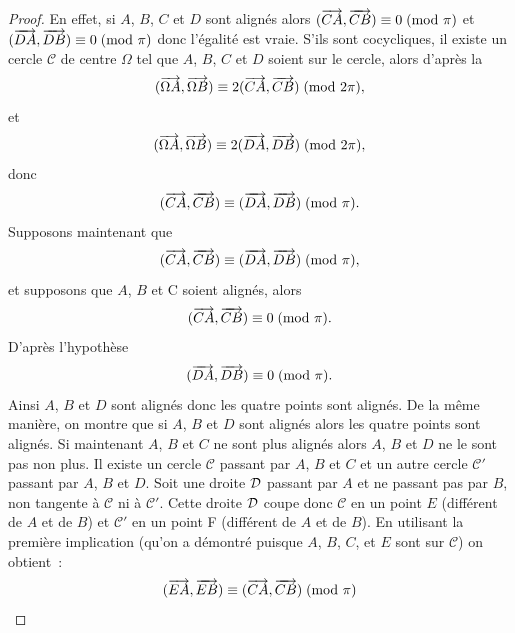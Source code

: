 \begin{proof}
  En effet, si \(A\), \(B\), \(C\) et \(D\) sont alignés alors
  \((\overrightarrow{CA},\overrightarrow{CB}) \equiv 0\!\pmod {\pi}\) et
  \((\overrightarrow{DA},\overrightarrow{DB}) \equiv 0\!\pmod {\pi}\) donc l'égalité est vraie. S'ils
  sont cocycliques, il existe un cercle \(\mathcal{C}\) de centre \(\Omega\)
  tel que \(A\), \(B\), \(C\) et \(D\) soient sur le cercle, alors d'après la
  \begin{equation}
    (\overrightarrow{\Omega A}, \overrightarrow{\Omega B}) \equiv 2(\overrightarrow{CA},\overrightarrow{CB})\!\pmod {2\pi},
  \end{equation}
  et \begin{equation}
    (\overrightarrow{\Omega A}, \overrightarrow{\Omega B}) \equiv 2(\overrightarrow{DA},\overrightarrow{DB})\!\pmod {2\pi},
  \end{equation}
  donc \begin{equation}
    (\overrightarrow{CA},\overrightarrow{CB}) \equiv (\overrightarrow{DA},\overrightarrow{DB})\!\pmod {\pi}.
  \end{equation}
  Supposons maintenant que \begin{equation}
    (\overrightarrow{CA},\overrightarrow{CB}) \equiv (\overrightarrow{DA},\overrightarrow{DB})\!\pmod {\pi},
  \end{equation}
  et supposons que \(A\), \(B\) et C soient alignés, alors \begin{equation}
    (\overrightarrow{CA},\overrightarrow{CB}) \equiv 0\!\pmod {\pi}.
  \end{equation}
  D'après l'hypothèse
  \begin{equation}
    (\overrightarrow{DA},\overrightarrow{DB}) \equiv 0\!\pmod {\pi}.
  \end{equation}
  Ainsi \(A\), \(B\) et \(D\) sont alignés donc les quatre points sont
  alignés. De la même manière, on montre que si \(A\), \(B\) et \(D\) sont
  alignés alors les quatre points sont alignés. Si maintenant \(A\), \(B\) et
  \(C\) ne sont plus alignés alors \(A\), \(B\) et \(D\) ne le sont pas non
  plus. Il existe un cercle \(\mathcal{C}\) passant par \(A\), \(B\) et \(C\)
  et un autre cercle \(\mathcal{C}'\) passant par \(A\), \(B\) et \(D\). Soit
  une droite \(\mathcal{D}\) passant par \(A\) et ne passant pas par \(B\), non
  tangente à \(\mathcal{C}\) ni à \(\mathcal{C}'\). Cette droite \(\mathcal{D}\) coupe
  donc \(\mathcal{C}\) en un point \(E\) (différent de \(A\) et de \(B\)) et
  \(\mathcal{C}'\) en un point F (différent de \(A\) et de \(B\)). En
  utilisant la première implication (qu'on a démontré puisque \(A\), \(B\),
  \(C\), et \(E\) sont sur \(\mathcal{C}\)) on obtient~:
  \begin{equation}
    (\overrightarrow{EA},\overrightarrow{EB}) \equiv (\overrightarrow{CA},\overrightarrow{CB})\!\pmod {\pi}
  \end{equation}

\end{proof}
